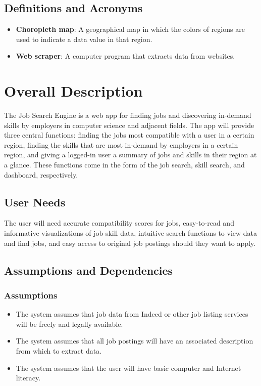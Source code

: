 \documentclass[titlepage]{article}
\begin{document}
\subsection{Definitions and Acronyms}

\begin{itemize}
    \item \textbf{Choropleth map}: A geographical map in which the colors of regions are used to indicate a data value in that region.
    \item \textbf{Web scraper}: A computer program that extracts data from websites.
\end{itemize}

\section{Overall Description}

The Job Search Engine is a web app for finding jobs and discovering in-demand skills by employers in computer science and adjacent fields. The app will provide three central functions: finding the jobs most compatible with a user in a certain region, finding the skills that are most in-demand by employers in a certain region, and giving a logged-in user a summary of jobs and skills in their region at a glance. These functions come in the form of the job search, skill search, and dashboard, respectively.

\subsection{User Needs}

The user will need accurate compatibility scores for jobs, easy-to-read and informative visualizations of job skill data, intuitive search functions to view data and find jobs, and easy access to original job postings should they want to apply.

\subsection{Assumptions and Dependencies}

\subsubsection{Assumptions}

\begin{itemize}
    \item The system assumes that job data from Indeed or other job listing services will be freely and legally available.
    \item The system assumes that all job postings will have an associated description from which to extract data.
    \item The system assumes that the user will have basic computer and Internet literacy.
\end{itemize}
\end{document}
